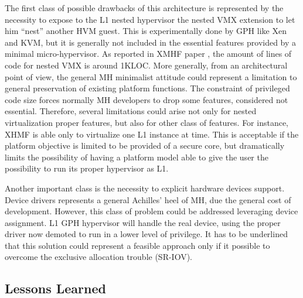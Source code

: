 \documentclass{sig-alternate}
\begin{document}
The first class of possible drawbacks of this architecture is represented by the necessity to expose to the L1 nested hypervisor the nested VMX extension to let him ``nest'' another HVM guest. This is experimentally done by GPH like Xen and KVM, but it is generally not included in the essential features provided by a minimal micro-hypervisor. As reported in XMHF paper \cite{xmhf}, the amount of lines of code for nested VMX is around 1KLOC. 
More generally, from an architectural point of view, the general MH minimalist attitude could represent a limitation to general preservation of existing platform functions. The constraint of privileged code size forces normally MH developers to drop some features, considered not essential. Therefore, several limitations could arise not only for nested virtualization proper features, but also for other class of features. For instance, XHMF is able only to virtualize one L1 instance at time. This is acceptable if the platform objective is limited to be provided of a secure core, but dramatically limits the possibility of having a platform model able to give the user the possibility to run its proper hypervisor as L1.

Another important class is the necessity to explicit hardware devices support. Device drivers represents a general Achilles' heel of MH, due the general cost of development. However, this class of problem could be addressed leveraging device assignment. L1 GPH hypervisor will handle the real device, using the proper driver now demoted to run in a lower level of privilege. It has to be underlined that this solution could represent a feasible approach only if it possible to overcome the exclusive allocation trouble (SR-IOV).
 
\subsection{Lessons Learned}
\end{document}
